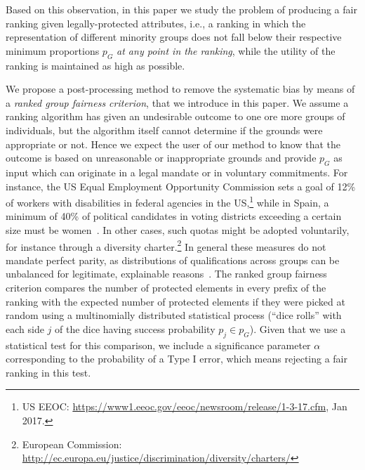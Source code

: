 Based on this observation, in this paper we study the problem of producing a fair ranking given legally-protected attributes, i.e., a ranking in which the representation of different minority groups does not fall below their respective minimum proportions $p_G$ \emph{at any point in the ranking}, while the utility of the ranking is maintained as high as possible.
%

We propose a post-processing method to remove the systematic bias by means of a \emph{ranked group fairness criterion}, that we introduce in this paper. 
%
We assume a ranking algorithm has given an undesirable outcome to one ore more groups of individuals, but the algorithm itself cannot determine if the grounds were appropriate or not. 
%
Hence we expect the user of our method to know that the outcome is based on unreasonable or inappropriate grounds and provide $p_G$ as input which can originate in a legal mandate or in voluntary commitments.
%
For instance, the US Equal Employment Opportunity Commission sets a goal of 12\% of workers with disabilities in federal agencies in the US,\footnote{US EEOC: \url{https://www1.eeoc.gov/eeoc/newsroom/release/1-3-17.cfm}, Jan 2017.}
%
while in Spain, a minimum of 40\% of political candidates in voting districts exceeding a certain size must be women~\cite{verge2010gendering}.
%
In other cases, such quotas might be adopted voluntarily, for instance through a diversity charter.\footnote{European Commission: \url{http://ec.europa.eu/justice/discrimination/diversity/charters/}}
%
In general these measures do not mandate perfect parity, as distributions of qualifications across groups can be unbalanced for legitimate, explainable reasons~\cite{zliobaite2011handling,pedreschi2009integrating}. %
%
The ranked group fairness criterion compares the number of protected elements in every prefix of the ranking with the expected number of protected elements if they were picked at random using a multinomially distributed statistical process (``dice rolls'' with each side $ j $ of the dice having success probability $p_j \in p_G$).
%
Given that we use a statistical test for this comparison, we include a significance parameter $\alpha$ corresponding to the probability of a Type I error, which means rejecting a fair ranking in this test.

